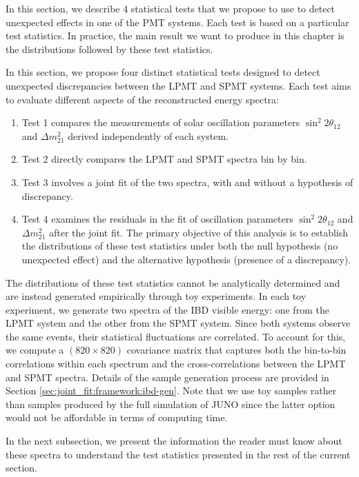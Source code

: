 \documentclass[../main.tex]{subfiles}
\begin{document}
In this section, we describe 4 statistical tests that we propose to use to detect unexpected effects in one of the PMT systems. Each test is based on a particular test statistics. In practice, the main result we want to produce in this chapter is the distributions followed by these test statistics.

In this section, we propose four distinct statistical tests designed to detect unexpected discrepancies between the LPMT and SPMT systems. Each test aims to evaluate different aspects of the reconstructed energy spectra:
\begin{enumerate}
  \item Test 1 compares the measurements of solar oscillation parameters $\sin^2{2 \theta_{12}}$ and $\Delta m^2_{21}$ derived independently of each system.
  \item Test 2 directly compares the LPMT and SPMT spectra bin by bin.
  \item Test 3 involves a joint fit of the two spectra, with and without a hypothesis of discrepancy.
  \item Test 4 examines the residuals in the fit of oscillation parameters $\sin^2{2 \theta_{12}}$ and $\Delta m^2_{21}$ after the joint fit. The primary objective of this analysis is to establish the distributions of these test statistics under both the null hypothesis (no unexpected effect) and the alternative hypothesis (presence of a discrepancy).
\end{enumerate}

The distributions of these test statistics cannot be analytically determined and are instead generated empirically through toy experiments. In each toy experiment, we generate two spectra of the IBD visible energy: one from the LPMT system and the other from the SPMT system. Since both systems observe the same events, their statistical fluctuations are correlated. To account for this, we compute a $(820 \times 820)$ covariance matrix that captures both the bin-to-bin correlations within each spectrum and the cross-correlations between the LPMT and SPMT spectra. Details of the sample generation process are provided in Section \ref{sec:joint_fit:framework:ibd-gen}.
Note that we use toy samples rather than samples produced by the full simulation of JUNO since the latter option would not be affordable in terms of computing time.

In the next subsection, we present the information the reader must know about these spectra to understand the test statistics presented in the rest of the current section.
\end{document}
